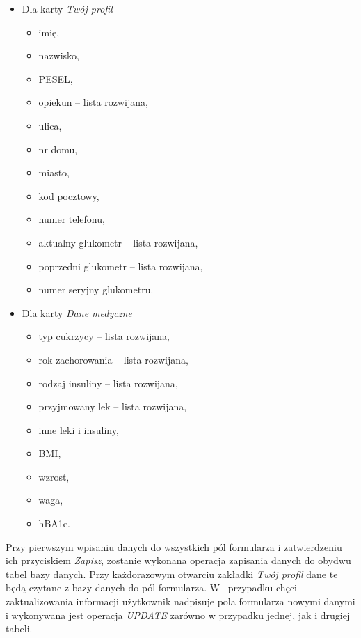 \begin{itemize}
	\item Dla karty \textit{Twój profil}
	\begin{itemize}
		\item imię,
		\item nazwisko,
		\item PESEL,
		\item opiekun -- lista rozwijana,
		\item ulica,
		\item nr domu,
		\item miasto,
		\item kod pocztowy,
		\item numer telefonu,
		\item aktualny glukometr -- lista rozwijana,
		\item poprzedni glukometr -- lista rozwijana,
		\item numer seryjny glukometru.
	\end{itemize}
	\item Dla karty \textit{Dane medyczne}
	\begin{itemize}
		\item typ cukrzycy -- lista rozwijana,
		\item rok zachorowania -- lista rozwijana,
		\item rodzaj insuliny -- lista rozwijana,
		\item przyjmowany lek -- lista rozwijana,
		\item inne leki i insuliny,
		\item BMI,
		\item wzrost,
		\item waga,
		\item hBA1c.
	\end{itemize}
\end{itemize}

Przy pierwszym wpisaniu danych do wszystkich pól formularza i zatwierdzeniu ich przyciskiem \textit{Zapisz}, zostanie wykonana operacja zapisania danych do obydwu tabel bazy danych. Przy każdorazowym otwarciu zakładki \textit{Twój profil} dane te będą czytane z bazy danych do pól formularza. W~ przypadku chęci zaktualizowania informacji użytkownik nadpisuje pola formularza nowymi danymi i wykonywana jest operacja \textit{UPDATE} zarówno w przypadku jednej, jak i drugiej tabeli.

